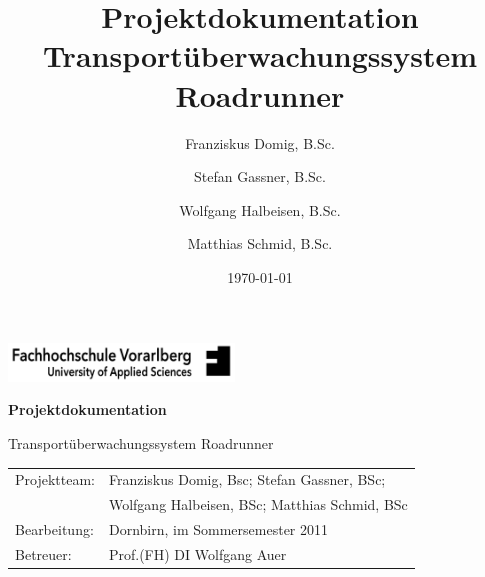 \documentclass[11pt,a4paper]{article}
\title{
	Projektdokumentation\\
	Transportüberwachungssystem Roadrunner
}
\author{
	Franziskus Domig, B.Sc.\\
		\and
	Stefan Gassner, B.Sc.\\
		\and
	Wolfgang Halbeisen, B.Sc.\\
		\and
	Matthias Schmid, B.Sc.\\	
}
\date{\today}
\begin{document}

\pagestyle{empty} %

\begin{center}

\includegraphics[width=60mm]{files/logo-fhv.png}

\vspace{4cm}
{\large\textbf{Projektdokumentation}}\vspace{.5cm}

{\LARGE Transportüberwachungssystem Roadrunner}

\end{center}

\vspace{13cm}


\begin{tabular}{ll}
	Projektteam: & Franziskus Domig, Bsc; Stefan Gassner, BSc;\\
	     	& Wolfgang Halbeisen, BSc; Matthias Schmid, BSc\\
	Bearbeitung: & Dornbirn, im Sommersemester 2011\\
	Betreuer:    & Prof.(FH) DI Wolfgang Auer\\
\end{tabular}


\clearpage
\pagestyle{fancy}
\setcounter{page}{1}



\clearpage
\tableofcontents

\clearpage
{}
\setcounter{page}{1}

\fancyfoot[CO]{\thepage}



\clearpage


\clearpage


\clearpage


\clearpage


\clearpage


\clearpage


\clearpage


\clearpage


\clearpage


\clearpage



\cleardoublepage



\fancyhead[R]{} %
\end{document}
